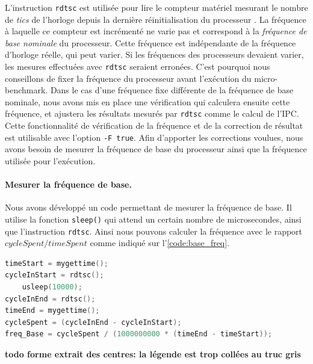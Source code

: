         
        L'instruction \verb|rdtsc| est utilisée pour lire le compteur matériel mesurant le nombre de \textit{tics} de l'horloge depuis la dernière réinitialisation du processeur \cite{code:rdtsc}. La fréquence à laquelle ce compteur est incrémenté ne varie pas et correspond à la \textit{fréquence de base nominale} du processeur. Cette fréquence est indépendante de la fréquence d'horloge réelle, qui peut varier. Si les fréquences des processeurs devaient varier, les mesures effectuées avec \verb|rdtsc| seraient erronées. C'est pourquoi nous conseillons de fixer la fréquence du processeur avant l'exécution du micro-benchmark. Dans le cas d'une fréquence fixe différente de la fréquence de base nominale, nous avons mis en place une vérification qui calculera ensuite cette fréquence, et ajustera les résultats mesurés par \verb|rdtsc| comme le calcul de l'\gls{IPC}. Cette fonctionnalité de vérification de la fréquence et de la correction de résultat est utilisable avec l'option \verb|-F true|. Afin d'apporter les corrections voulues, nous avons besoin de mesurer la fréquence de base du processeur ainsi que la fréquence utilisée pour l'exécution.
        
        \paragraph{Mesurer la fréquence de base.} Nous avons développé un code permettant de mesurer la fréquence de base. Il utilise la fonction \verb=sleep()= qui attend un certain nombre de microsecondes, ainsi que l'instruction \verb|rdtsc|. Ainsi nous pouvons calculer la fréquence avec le rapport $cycleSpent / timeSpent$ comme indiqué sur l'\autoref{code:base_freq}. 
        

\begin{minipage}{0.97\linewidth}         \begin{lstlisting}[label=code:base_freq ,language=C, caption={Code utilisé pour mesurer la fréquence de base du processeur. La fonction \texttt{mygettime()} utilise la fonction \texttt{gettimeofday()}\protect\footnotemark ~permet de mesurer le temps nécessaire à l'exécution du code.}]
timeStart = mygettime();
cycleInStart = rdtsc();
    usleep(10000);
cycleInEnd = rdtsc();
timeEnd = mygettime();
cycleSpent = (cycleInEnd - cycleInStart);
freq_Base = cycleSpent / (1000000000 * (timeEnd - timeStart));
\end{lstlisting} \end{minipage}
\textbf{todo forme extrait des centres: la légende est trop collées au truc gris}

